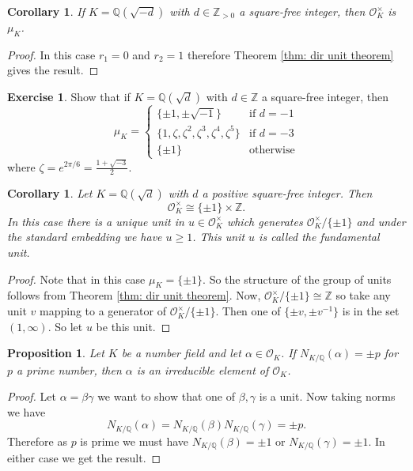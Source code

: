 \documentclass[11pt,a4paper]{report}
\theoremstyle{plain}
\newtheorem{corollary}[subsection]{Corollary}
\newtheorem{prop}[subsection]{Proposition}
\theoremstyle{definition}
\theoremstyle{definition}
\newtheorem{question}[subsection]{Exercise}
\newcommand{\ZZ}{\mathbb{Z}}
\def\QQ{\mathbb{Q}}
\def \Nm {N_{K/\QQ}}
\def \a{\alpha}
\def \OO {\mathcal{O}}
\begin{document}
	\begin{corollary}
		If $K=\QQ(\sqrt{-d})$ with $d \in \ZZ_{> 0}$ a square-free integer, then $\OO_K^\times$ is  $\mu_K$.
	\end{corollary}
	
	\begin{proof}
		In this case $r_1=0$ and $r_2=1$ therefore Theorem \ref{thm: dir unit theorem} gives the result.
	\end{proof}
	
	
	\begin{question}\label{ques: units in img quad}
		Show that if $K=\QQ(\sqrt{d})$ with $d \in \ZZ$ a square-free integer, then \[
		{\mu_K=} \begin{cases} \{\pm 1, \pm \sqrt{-1}\} & \text{if } d=-1\\
			\{1, \zeta, \zeta^2, \zeta^3, \zeta^4, \zeta^5  \} & \text{if } d=-3\\
			\{\pm 1\} & \text{otherwise}
		\end{cases}\]
		where $\zeta=e^{2\pi/6}=\frac{1+\sqrt{-3}}{2}$.
	\end{question}
	
	\begin{corollary}
		Let $K=\QQ(\sqrt{d})$ with $d$ a positive square-free integer. Then \[\OO_K^{\times} \cong \{\pm 1\} \times \ZZ.\] In this case there is a unique unit in $u \in \OO_K^{\times}$ which generates $\OO_K^\times/ \{\pm 1\}$ and under the standard embedding we have $u \geq 1$. This unit $u$ is called the fundamental unit.
	\end{corollary}
	
	\begin{proof}
		Note that in this case $\mu_K=\{\pm 1\}$. So the structure of the group of units follows from Theorem \ref{thm: dir unit theorem}. Now, $\OO_{K}^{\times}/\{\pm 1\} \cong \ZZ$ so take any unit $v$ mapping to a generator of  $\OO_{K}^{\times}/\{\pm 1\}$. Then one of $\{\pm v, \pm v^{-1}\}$  is in the set $(1,\infty)$. So let $u$ be this unit.
	\end{proof}
	
	
	
	
	
	
	
	\begin{prop}
		Let $K$ be a number field and let $\a \in \OO_K$. If $N_{K/\QQ}(\a)=\pm p$ for $p$ a prime number, then $\a$ is an irreducible element of $\OO_K$.
	\end{prop}
	
	\begin{proof}
		Let $\a=\beta \gamma$ we want to show that one of $\beta,\gamma$ is a unit. Now taking norms we have \[\Nm(\a)=\Nm(\beta)\Nm(\gamma)=\pm p. \] Therefore as $p$ is prime we must have $\Nm(\beta)=\pm 1$ or $\Nm(\gamma)=\pm 1$. In either case we get the result. 
	\end{proof}
	
\end{document}
